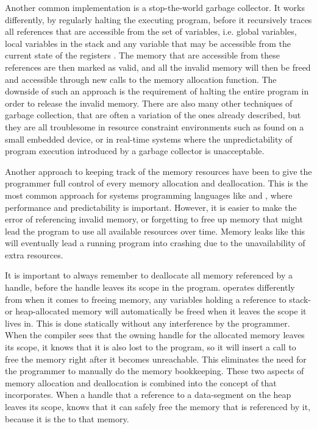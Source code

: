 Another common implementation is a stop-the-world garbage collector.
It works differently, by regularly halting the executing program, before it recursively traces all references that are accessible from the  set of variables, i.e. global variables, local variables in the stack and any variable that may be accessible from the current state of the registers \cite{Wilson1992}.
The memory that are accessible from these references are then marked as valid, and all the invalid memory will then be freed and accessible through new calls to the memory allocation function.
The downside of such an approach is the requirement of halting the entire program in order to release the invalid memory.
There are also many other techniques of garbage collection, that are often a variation of the ones already described, but they are all troublesome in resource constraint environments such as found on a small embedded device, or in real-time systems where the unpredictability of program execution introduced by a garbage collector is unacceptable.

Another approach to keeping track of the memory resources have been to give the programmer full control of every memory allocation and deallocation.
This is the most common approach for systems programming languages like {\C} and {\Cpp}, where performance and predictability is important.
However, it is easier to make the error of referencing invalid memory, or forgetting to free up memory that might lead the program to use all available resources over time.
Memory leaks like this will eventually lead a running program into crashing due to the unavailability of extra resources.

It is important to always remember to deallocate all memory referenced by a handle, before the handle leaves its scope in the program.
{\rust} operates differently from {\C} when it comes to freeing memory, any variables holding a reference to stack- or heap-allocated memory will automatically be freed when it leaves the scope it lives in.
This is done statically without any interference by the programmer.
When the compiler sees that the owning handle for the allocated memory leaves its scope, it knows that it is also lost to the program, so it will insert a call to free the memory right after it becomes unreachable.
This eliminates the need for the programmer to manually do the memory bookkeeping.
These two aspects of memory allocation and deallocation is combined into the concept of  that {\rust} incorporates.
When a handle that  a reference to a data-segment on the heap leaves its scope, {\rust} knows that it can safely free the memory that is referenced by it, because it is the  to that memory.

